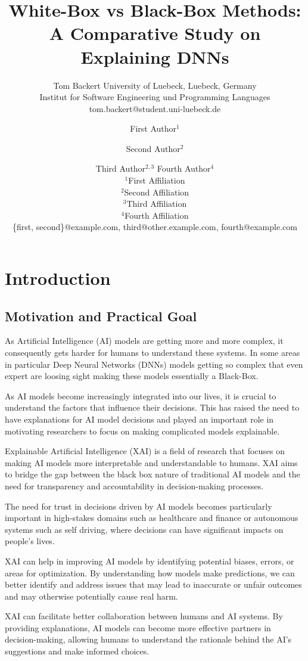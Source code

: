 \documentclass{article}
\title{White-Box vs Black-Box Methods: A Comparative Study on Explaining DNNs}
\author{
    Tom Backert
    \affiliations
    University of Luebeck, Luebeck, Germany\\
    Institut for Software Engineering und Programming Languages
    \emails
    tom.backert@student.uni-luebeck.de
}
\author{
First Author$^1$
\and
Second Author$^2$\and
Third Author$^{2,3}$\And
Fourth Author$^4$\\
\affiliations
$^1$First Affiliation\\
$^2$Second Affiliation\\
$^3$Third Affiliation\\
$^4$Fourth Affiliation\\
\emails
\{first, second\}@example.com,
third@other.example.com,
fourth@example.com
}
\begin{document}
\maketitle

\begin{abstract}
\end{abstract}

\section{Introduction}
\subsection{Motivation and Practical Goal}
As Artificial Intelligence (AI) models are getting more and more complex, it consequently gets harder for humans to understand these systems. In some areas in particular Deep Neural Networks (DNNs) models getting so complex that even expert are loosing sight making these models essentially a Black-Box. 

As AI models become increasingly integrated into our lives, it is crucial to understand the factors that influence their decisions. This has raised the need to have explanations for AI model decisions and played an important role in motivating researchers to focus on making complicated models explainable.

Explainable Artificial Intelligence (XAI) is a field of research that focuses on making AI models more interpretable and understandable to humans. XAI aims to bridge the gap between the black box nature of traditional AI models and the need for transparency and accountability in decision-making processes. 

The need for trust in decisions driven by AI models becomes particularly important in high-stakes domains such as healthcare and finance or autonomous systems such as self driving, where decisions can have significant impacts on people's lives.

XAI can help in improving AI models by identifying potential biases, errors, or areas for optimization. By understanding how models make predictions, we can better identify and address issues that may lead to inaccurate or unfair outcomes and may otherwise potentially cause real harm.

XAI can facilitate better collaboration between humans and AI systems. By providing explanations, AI models can become more effective partners in decision-making, allowing humans to understand the rationale behind the AI's suggestions and make informed choices.
\end{document}
